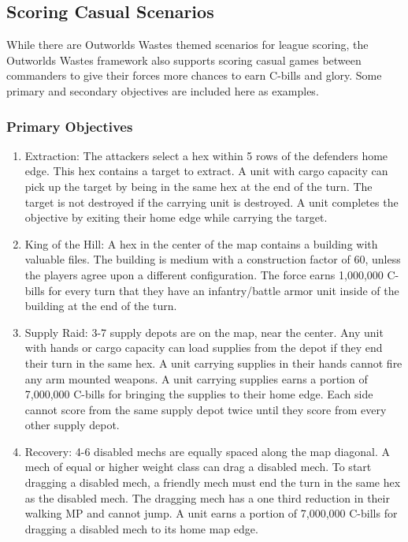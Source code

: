 \documentclass[UTF8]{article}
\begin{document}
\subsection{Scoring Casual Scenarios}

While there are Outworlds Wastes themed scenarios for league scoring, the Outworlds Wastes framework also supports scoring casual games between commanders to give their forces more chances to earn C-bills and glory.
Some primary and secondary objectives are included here as examples.\\

\subsubsection{Primary Objectives}

\begin{enumerate}

\item Extraction: The attackers select a hex within 5 rows of the defenders home edge.
This hex contains a target to extract.
A unit with cargo capacity can pick up the target by being in the same hex at the end of the turn.
The target is not destroyed if the carrying unit is destroyed.
A unit completes the objective by exiting their home edge while carrying the target.

\item King of the Hill: A hex in the center of the map contains a building with valuable files.
The building is medium with a construction factor of 60, unless the players agree upon a different configuration.
The force earns 1,000,000 C-bills for every turn that they have an infantry/battle armor unit inside of the building at the end of the turn.

\item Supply Raid: 3-7 supply depots are on the map, near the center.
Any unit with hands or cargo capacity can load supplies from the depot if they end their turn in the same hex.
A unit carrying supplies in their hands cannot fire any arm mounted weapons.
A unit carrying supplies earns a portion of 7,000,000 C-bills for bringing the supplies to their home edge.
Each side cannot score from the same supply depot twice until they score from every other supply depot.

\item Recovery: 4-6 disabled mechs are equally spaced along the map diagonal.
A mech of equal or higher weight class can drag a disabled mech.
To start dragging a disabled mech, a friendly mech must end the turn in the same hex as the disabled mech.
The dragging mech has a one third reduction in their walking MP and cannot jump.
A unit earns a portion of 7,000,000 C-bills for dragging a disabled mech to its home map edge.


\end{enumerate}
\end{document}
